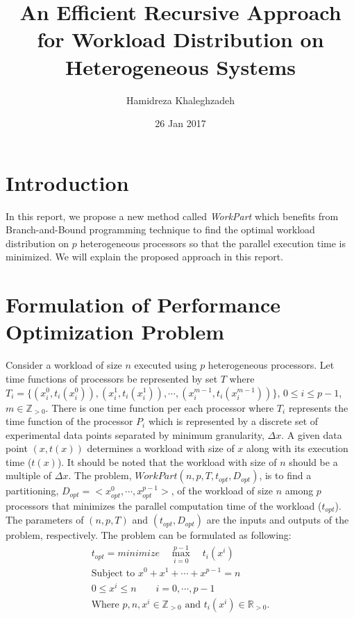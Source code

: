 \documentclass[12pt]{article}
\begin{document}
\title{An Efficient Recursive Approach for Workload Distribution on Heterogeneous Systems}
\author{Hamidreza Khaleghzadeh}
\date{26 Jan 2017}

\maketitle

\section{Introduction}
In this report, we propose a new method called \textit{WorkPart} which benefits from Branch-and-Bound programming technique to find the optimal workload distribution on $p$ heterogeneous processors so that the parallel execution time is minimized. We will explain the proposed approach in this report.

\section{Formulation of Performance Optimization Problem}
Consider a workload of size $n$ executed using $p$ heterogeneous processors. Let time functions of processors be represented by set $T$ where $T_i=\{(x_i^0,t_i(x_i^0)),(x_i^1,t_i(x_i^1)),\cdots,\allowbreak (x_i^{m-1},t_i(x_i^{m-1}))\}$, $0 \le i \le p-1$, $m \in \mathbb{Z}_{>0}$. There is one time function per each processor where $T_i$ represents the time function of the processor $P_i$ which is represented by a discrete set of experimental data points separated by minimum granularity, $\Delta x$. A given data point $(x,t(x))$ determines a workload with size of $x$ along with its execution time ($t(x)$). It should be noted that the workload with size of $n$ should be a multiple of $\Delta x$. The problem, $WorkPart(n,p,T,t_{opt},D_{opt})$, is to find a partitioning, $D_{opt} = <x_{opt}^0,\cdots,x_{opt}^{p-1}>$, of the workload of size $n$ among $p$ processors that minimizes the parallel computation time of the workload ($t_{opt}$). The parameters of $(n,p,T)$ and $(t_{opt},D_{opt})$ are the inputs and outputs of the problem, respectively. The problem can be formulated as following:
\begin{equation} \label{eq1}
\begin{split}
t_{opt} = minimize \quad \max_{i=0}^{p-1} \quad t_i(x^i) \\
\text{Subject to } x^0+x^1+\cdots+x^{p-1} = n \\
0 \le x^i \le n \qquad i = 0,\cdots,p-1 \\
\text{Where } p,n,x^i \in \mathbb{Z}_{>0} \text{ and } t_i(x^i) \in \mathbb{R}_{>0}.
\end{split}
\end{equation}
\end{document}
